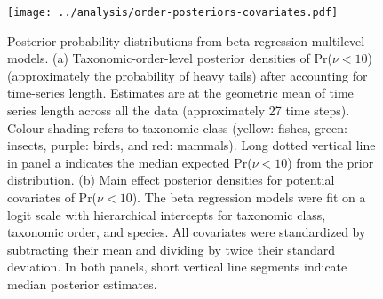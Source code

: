 \begin{figure}[htbp]
\begin{center}
\texttt{[image: ../analysis/order-posteriors-covariates.pdf]}
\caption{
Posterior probability distributions from beta regression multilevel models.
(a) Taxonomic-order-level posterior densities of Pr($\nu < 10$) (approximately the probability of heavy tails) after accounting for time-series length. Estimates are at the geometric mean of time series length across all the data (approximately 27 time steps). Colour shading refers to taxonomic class (yellow: fishes, green: insects, purple: birds, and red: mammals). Long dotted vertical line in panel a indicates the median expected Pr($\nu < 10$) from the prior distribution.
(b) Main effect posterior densities for potential covariates of Pr($\nu < 10$). The beta regression models were fit on a logit scale with hierarchical intercepts for taxonomic class, taxonomic order, and species. All covariates were standardized by subtracting their mean and dividing by twice their standard deviation.
In both panels, short vertical line segments indicate median posterior estimates.
}
\label{fig:posteriors}
\end{center}
\end{figure}
